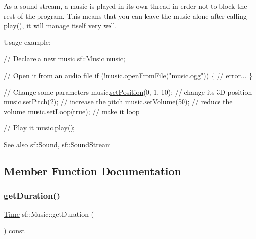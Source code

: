 As a sound stream, a music is played in its own thread in order not to block the rest of the program. This means that you can leave the music alone after calling \hyperlink{classsf_1_1_sound_stream_afdc08b69cab5f243d9324940a85a1144}{play()}, it will manage itself very well.

Usage example\+: 
\begin{DoxyCode}
\textcolor{comment}{// Declare a new music}
\hyperlink{classsf_1_1_music}{sf::Music} music;

\textcolor{comment}{// Open it from an audio file}
\textcolor{keywordflow}{if} (!music.\hyperlink{classsf_1_1_music_a3edc66e5f5b3f11e84b90eaec9c7d7c0}{openFromFile}(\textcolor{stringliteral}{"music.ogg"}))
\{
    \textcolor{comment}{// error...}
\}

\textcolor{comment}{// Change some parameters}
music.\hyperlink{classsf_1_1_sound_source_a0480257ea25d986eba6cc3c1a6f8d7c2}{setPosition}(0, 1, 10); \textcolor{comment}{// change its 3D position}
music.\hyperlink{classsf_1_1_sound_source_a72a13695ed48b7f7b55e7cd4431f4bb6}{setPitch}(2);           \textcolor{comment}{// increase the pitch}
music.\hyperlink{classsf_1_1_sound_source_a2f192f2b49fb8e2b82f3498d3663fcc2}{setVolume}(50);         \textcolor{comment}{// reduce the volume}
music.\hyperlink{classsf_1_1_sound_stream_a43fade018ffba7e4f847a9f00b353f3d}{setLoop}(\textcolor{keyword}{true});         \textcolor{comment}{// make it loop}

\textcolor{comment}{// Play it}
music.\hyperlink{classsf_1_1_sound_stream_afdc08b69cab5f243d9324940a85a1144}{play}();
\end{DoxyCode}


\begin{DoxySeeAlso}{See also}
\hyperlink{classsf_1_1_sound}{sf\+::\+Sound}, \hyperlink{classsf_1_1_sound_stream}{sf\+::\+Sound\+Stream} 
\end{DoxySeeAlso}


\subsection{Member Function Documentation}
\mbox{\label{classsf_1_1_music_a288ef6f552a136b0e56952dcada3d672}} 
\subsubsection{\texorpdfstring{get\+Duration()}{getDuration()}}
{\footnotesize\ttfamily \hyperlink{classsf_1_1_time}{Time} sf\+::\+Music\+::get\+Duration (\begin{DoxyParamCaption}{ }\end{DoxyParamCaption}) const}



